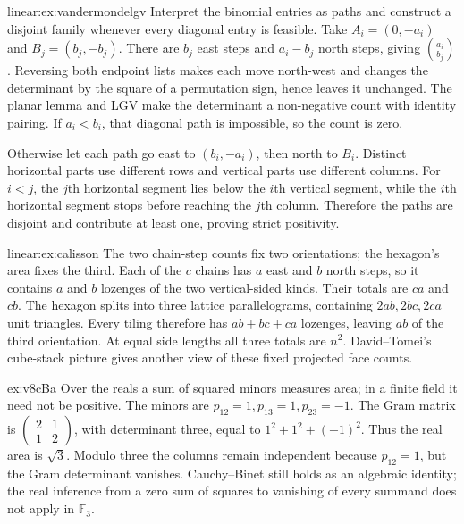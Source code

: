 \begin{solution}{linear:ex:vandermondelgv}
\idea Interpret the binomial entries as paths and construct a disjoint family whenever every diagonal entry is feasible.
\writeup Take $A_i=(0,-a_i)$ and $B_j=(b_j,-b_j)$. There are $b_j$ east steps and $a_i-b_j$ north steps, giving $\binom{a_i}{b_j}$. Reversing both endpoint lists makes each move north-west and changes the determinant by the square of a permutation sign, hence leaves it unchanged. The planar lemma and LGV make the determinant a non-negative count with identity pairing. If $a_i<b_i$, that diagonal path is impossible, so the count is zero.

Otherwise let each path go east to $(b_i,-a_i)$, then north to $B_i$. Distinct horizontal parts use different rows and vertical parts use different columns. For $i<j$, the $j$th horizontal segment lies below the $i$th vertical segment, while the $i$th horizontal segment stops before reaching the $j$th column. Therefore the paths are disjoint and contribute at least one, proving strict positivity.
\end{solution}
\begin{solution}{linear:ex:calisson}
\idea The two chain-step counts fix two orientations; the hexagon's area fixes the third.
\writeup Each of the $c$ chains has $a$ east and $b$ north steps, so it contains $a$ and $b$ lozenges of the two vertical-sided kinds. Their totals are $ca$ and $cb$. The hexagon splits into three lattice parallelograms, containing $2ab,2bc,2ca$ unit triangles. Every tiling therefore has $ab+bc+ca$ lozenges, leaving $ab$ of the third orientation. At equal side lengths all three totals are $n^2$. David--Tomei's cube-stack picture gives another view of these fixed projected face counts.
\end{solution}
\begin{solution}{ex:v8cBa}
\idea Over the reals a sum of squared minors measures area; in a finite field it need not be positive.
\writeup The minors are $p_{12}=1,p_{13}=1,p_{23}=-1$. The Gram matrix is $\begin{pmatrix}2&1\\1&2\end{pmatrix}$, with determinant three, equal to $1^2+1^2+(-1)^2$. Thus the real area is $\sqrt3$. Modulo three the columns remain independent because $p_{12}=1$, but the Gram determinant vanishes. Cauchy--Binet still holds as an algebraic identity; the real inference from a zero sum of squares to vanishing of every summand does not apply in $\mathbb F_3$.
\end{solution}

